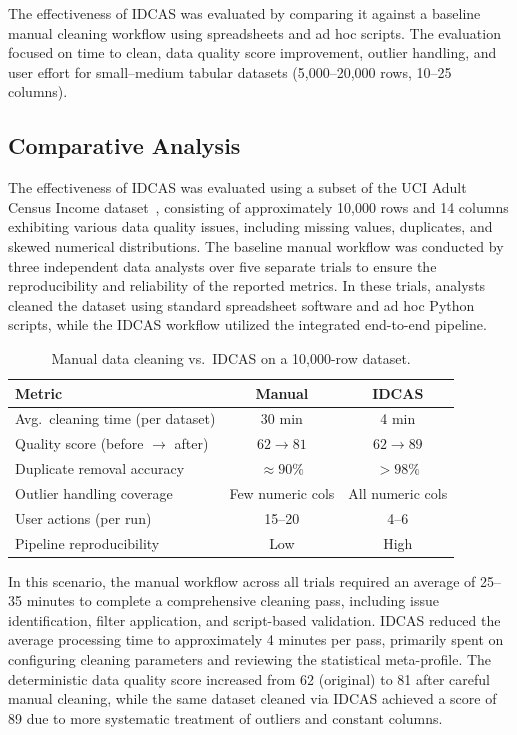 \documentclass[conference]{IEEEtran}
\begin{document}
The effectiveness of IDCAS was evaluated by comparing it against a baseline manual cleaning workflow using spreadsheets and ad hoc scripts. The evaluation focused on time to clean, data quality score improvement, outlier handling, and user effort for small--medium tabular datasets (5,000--20,000 rows, 10--25 columns).

\subsection{Comparative Analysis}

The effectiveness of IDCAS was evaluated using a subset of the UCI Adult Census Income dataset~\cite{ref_uci}, consisting of approximately 10,000 rows and 14 columns exhibiting various data quality issues, including missing values, duplicates, and skewed numerical distributions. The baseline manual workflow was conducted by three independent data analysts over five separate trials to ensure the reproducibility and reliability of the reported metrics. In these trials, analysts cleaned the dataset using standard spreadsheet software and ad hoc Python scripts, while the IDCAS workflow utilized the integrated end-to-end pipeline.

\begin{table}[htbp]
\centering
\small
\begin{tabular}{@{}lcc@{}}
\toprule
\textbf{Metric} & \textbf{Manual} & \textbf{IDCAS} \\ 
\midrule
Avg.\ cleaning time (per dataset) & 30 min & 4 min \\
Quality score (before $\rightarrow$ after) & $62 \rightarrow 81$ & $62 \rightarrow 89$ \\
Duplicate removal accuracy & $\approx 90\%$ & $> 98\%$ \\
Outlier handling coverage & Few numeric cols & All numeric cols \\
User actions (per run) & 15--20 & 4--6 \\
Pipeline reproducibility & Low & High \\
\bottomrule
\end{tabular}
\caption{Manual data cleaning vs.\ IDCAS on a 10,000-row dataset.}
\label{tab:idcas-comparison}
\end{table}

In this scenario, the manual workflow across all trials required an average of 25--35 minutes to complete a comprehensive cleaning pass, including issue identification, filter application, and script-based validation. IDCAS reduced the average processing time to approximately 4 minutes per pass, primarily spent on configuring cleaning parameters and reviewing the statistical meta-profile. 
 The deterministic data quality score increased from 62 (original) to 81 after careful manual cleaning, while the same dataset cleaned via IDCAS achieved a score of 89 due to more systematic treatment of outliers and constant columns.
\end{document}
